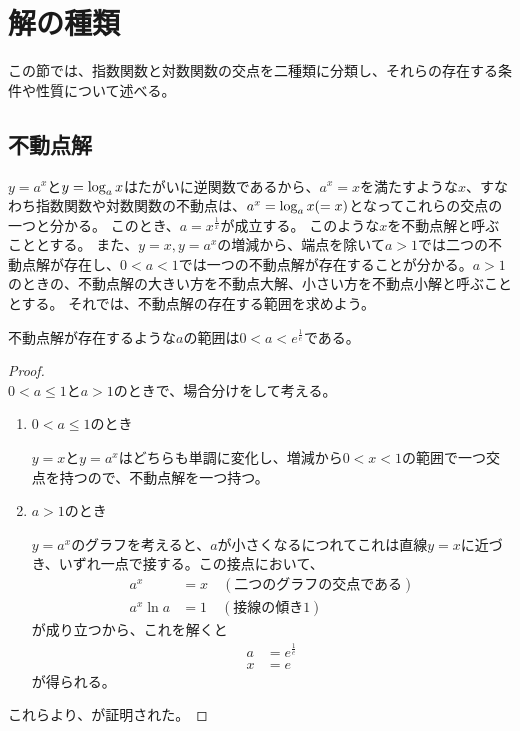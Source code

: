 \section{解の種類}
	この節では、指数関数と対数関数の交点を二種類に分類し、それらの存在する条件や性質について述べる。
	
\subsection{不動点解}
	$y = a^x$と$y = \log_{a} x$はたがいに逆関数であるから、$a^x = x$を満たすような$x$、すなわち指数関数や対数関数の不動点は、$a^x = \log_{a} x( = x)$となってこれらの交点の一つと分かる。
	このとき、$a = x^{\frac{1}{x}}$が成立する。
	このような$x$を不動点解と呼ぶこととする。
	また、$y = x,y = a^x$の増減から、端点を除いて$a > 1$では二つの不動点解が存在し、$0 < a < 1$では一つの不動点解が存在することが分かる。$a > 1$のときの、不動点解の大きい方を不動点大解、小さい方を不動点小解と呼ぶこととする。
	それでは、不動点解の存在する範囲を求めよう。
	\begin{theorem}
	\label{th:fixed_solutions}
		不動点解が存在するような$a$の範囲は$0 < a < e^\frac{1}{e}$である。
	\end{theorem}
	\begin{proof} \mbox{}\\
		$0 < a \leq 1$と$a > 1$のときで、場合分けをして考える。
		\begin{enumerate}
			\item $0 < a \leq 1$のとき
			
				$y = x$と$y = a^x$はどちらも単調に変化し、増減から$0 < x < 1$の範囲で一つ交点を持つので、不動点解を一つ持つ。
			\item $a > 1$のとき
			
				$y = a^x$のグラフを考えると、$a$が小さくなるにつれてこれは直線$y = x$に近づき、いずれ一点で接する。この接点において、
				\begin{align*}
					a^x &= x \quad (\text{二つのグラフの交点である}) \\
					a^x\ln{a} &= 1 \quad (\text{接線の傾き1})
				\end{align*}
				が成り立つから、これを解くと
				\begin{align*}
					a &= e^\frac{1}{e} \\
					x &= e 
				\end{align*}
				が得られる。
		\end{enumerate}
		これらより、が証明された。
	\end{proof}

